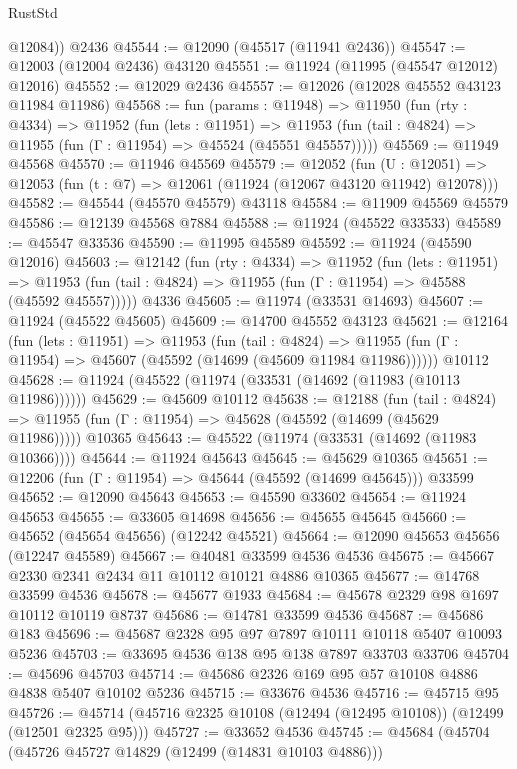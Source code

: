 \begin{lexlean}{RustStd}
\begin{coremodule}
        @12084))
    @2436
@45544 := @12090 (@45517 (@11941 @2436))
@45547 := @12003 (@12004 @2436) @43120
@45551 := @11924 (@11995 (@45547 @12012) @12016)
@45552 := @12029 @2436
@45557 := @12026 (@12028 @45552 @43123 @11984 @11986)
@45568 := fun (params : @11948) =>
  @11950
    (fun (rty : @4334) =>
    @11952
      (fun (lets : @11951) =>
      @11953 (fun (tail : @4824) => @11955 (fun (Γ : @11954) => @45524 (@45551 @45557)))))
@45569 := @11949 @45568
@45570 := @11946 @45569
@45579 := @12052
    (fun (U : @12051) => @12053 (fun (t : @7) => @12061 (@11924 (@12067 @43120 @11942) @12078)))
@45582 := @45544 (@45570 @45579) @43118
@45584 := @11909 @45569 @45579
@45586 := @12139 @45568 @7884
@45588 := @11924 (@45522 @33533)
@45589 := @45547 @33536
@45590 := @11995 @45589
@45592 := @11924 (@45590 @12016)
@45603 := @12142
    (fun (rty : @4334) =>
    @11952
      (fun (lets : @11951) =>
      @11953 (fun (tail : @4824) => @11955 (fun (Γ : @11954) => @45588 (@45592 @45557)))))
    @4336
@45605 := @11974 (@33531 @14693)
@45607 := @11924 (@45522 @45605)
@45609 := @14700 @45552 @43123
@45621 := @12164
    (fun (lets : @11951) =>
    @11953
      (fun (tail : @4824) =>
      @11955 (fun (Γ : @11954) => @45607 (@45592 (@14699 (@45609 @11984 @11986))))))
    @10112
@45628 := @11924 (@45522 (@11974 (@33531 (@14692 (@11983 (@10113 @11986))))))
@45629 := @45609 @10112
@45638 := @12188
    (fun (tail : @4824) => @11955 (fun (Γ : @11954) => @45628 (@45592 (@14699 (@45629 @11986)))))
    @10365
@45643 := @45522 (@11974 (@33531 (@14692 (@11983 @10366))))
@45644 := @11924 @45643
@45645 := @45629 @10365
@45651 := @12206 (fun (Γ : @11954) => @45644 (@45592 (@14699 @45645))) @33599
@45652 := @12090 @45643
@45653 := @45590 @33602
@45654 := @11924 @45653
@45655 := @33605 @14698
@45656 := @45655 @45645
@45660 := @45652 (@45654 @45656) (@12242 @45521)
@45664 := @12090 @45653 @45656 (@12247 @45589)
@45667 := @40481 @33599 @4536 @4536
@45675 := @45667 @2330 @2341 @2434 @11 @10112 @10121 @4886 @10365
@45677 := @14768 @33599 @4536
@45678 := @45677 @1933
@45684 := @45678 @2329 @98 @1697 @10112 @10119 @8737
@45686 := @14781 @33599 @4536
@45687 := @45686 @183
@45696 := @45687 @2328 @95 @97 @7897 @10111 @10118 @5407 @10093 @5236
@45703 := @33695 @4536 @138 @95 @138 @7897 @33703 @33706
@45704 := @45696 @45703
@45714 := @45686 @2326 @169 @95 @57 @10108 @4886 @4838 @5407 @10102 @5236
@45715 := @33676 @4536
@45716 := @45715 @95
@45726 := @45714 (@45716 @2325 @10108 (@12494 (@12495 @10108)) (@12499 (@12501 @2325 @95)))
@45727 := @33652 @4536
@45745 := @45684
    (@45704
      (@45726 @45727 @14829 (@12499 (@14831 @10103 @4886)))

\end{coremodule}
\end{lexlean}
